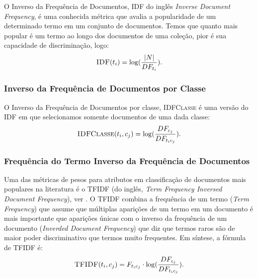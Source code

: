 O Inverso da Frequência de Documentos, \textsc{IDF} do inglês \textit{Inverse Document Frequency}, é uma conhecida métrica que avalia a popularidade de um determinado termo em um conjunto de documentos. Temos que quanto mais popular é um termo ao longo dos documentos de uma coleção, pior é sua capacidade de discriminação, logo:
\begin{equation}\label{eqn::tficf}
 \textsc{IDF}(t_i) = \log( \frac{|N|} {DF_{t_i}} ).
\end{equation}


\subsubsection{Inverso da Frequência de Documentos por Classe}%
\label{subsubsection::idf}

O Inverso da Frequência de Documentos por classe, \textsc{IDFClasse} é uma versão do \textsc{IDF} em que selecionamos somente documentos de uma dada classe:
\begin{equation}\label{eqn::tficf}
 \textsc{IDFClasse}(t_i,c_j) = \log( \frac{DF_{c_j}} {DF_{t_ic_j} }).
\end{equation}



\subsubsection{Frequência do Termo Inverso da Frequência de Documentos}%
\label{subsubsection::tfidf}

Uma das métricas de pesos para atributos em classificação de documentos mais populares na literatura é o \textsc{TFIDF} (do inglês, \textit{Term Frequency Inversed Document Frequency}), ver \cite{Salton88}. O \textsc{TFIDF} combina a frequência de um termo (\textit{Term Frequency}) que assume que múltiplas aparições de um termo em um documento é mais importante que aparições únicas com o inverso da frequência de um documento (\textit{Inverded Document Frequency}) que diz que termos raros são de maior poder discriminativo que termos muito frequentes. Em síntese, a fórmula de \textsc{TFIDF} é:
\begin{equation}\label{eqn::tficf}
 \textsc{TFIDF}(t_i, c_j) =  F_{t_ic_j} \cdot \log( \frac{DF_{c_j}}{ DF_{t_ic_j} } ).
\end{equation}

